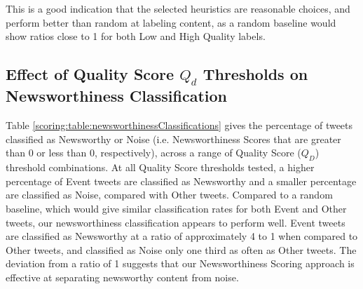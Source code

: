This is a good indication that the selected heuristics are reasonable choices, and perform better than random at labeling content, as a random baseline would show ratios close to 1 for both Low and High Quality labels.

\subsection{Effect of Quality Score $Q_d$ Thresholds on Newsworthiness Classification}

Table \ref{scoring:table:newsworthinessClassifications} gives the percentage of tweets classified as Newsworthy or Noise (i.e. Newsworthiness Scores that are greater than 0 or less than 0, respectively), across a range of Quality Score ($Q_D$) threshold combinations.
At all Quality Score thresholds tested, a higher percentage of Event tweets are classified as Newsworthy and a smaller percentage are classified as Noise, compared with Other tweets.
Compared to a random baseline, which would give similar classification rates for both Event and Other tweets, our newsworthiness classification appears to perform well.
Event tweets are classified as Newsworthy at a ratio of approximately 4 to 1 when compared to Other tweets, and classified as Noise only one third as often as Other tweets.
The deviation from a ratio of 1 suggests that our Newsworthiness Scoring approach is effective at separating newsworthy content from noise.

